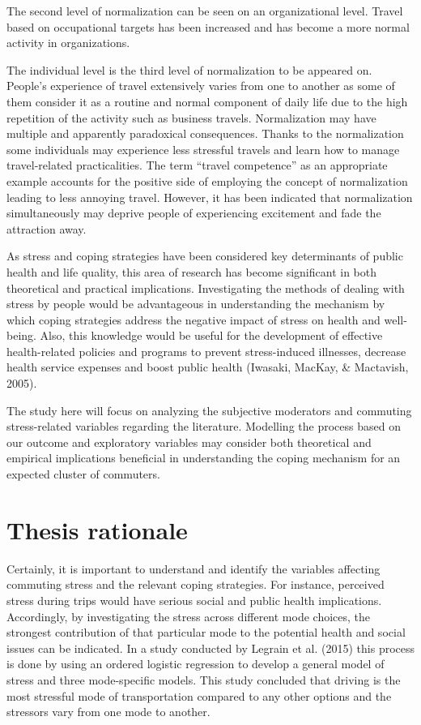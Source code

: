 \documentclass[
11pt, %
oneside, %
english, %
singlespacing, %
]{macthesis} %
\begin{document}
The second level of normalization can be seen on an organizational level. Travel based on occupational targets has been increased and has become a more normal activity in organizations.

The individual level is the third level of normalization to be appeared on. People's experience of travel extensively varies from one to another as some of them consider it as a routine and normal component of daily life due to the high repetition of the activity such as business travels. Normalization may have multiple and apparently paradoxical consequences. Thanks to the normalization some individuals may experience less stressful travels and learn how to manage travel-related practicalities. The term ``travel competence'' as an appropriate example accounts for the positive side of employing the concept of normalization leading to less annoying travel. However, it has been indicated that normalization simultaneously may deprive people of experiencing excitement and fade the attraction away.

As stress and coping strategies have been considered key determinants of public health and life quality, this area of research has become significant in both theoretical and practical implications. Investigating the methods of dealing with stress by people would be advantageous in understanding the mechanism by which coping strategies address the negative impact of stress on health and well-being. Also, this knowledge would be useful for the development of effective health-related policies and programs to prevent stress-induced illnesses, decrease health service expenses and boost public health (Iwasaki, MacKay, \& Mactavish, 2005).

The study here will focus on analyzing the subjective moderators and commuting stress-related variables regarding the literature. Modelling the process based on our outcome and exploratory variables may consider both theoretical and empirical implications beneficial in understanding the coping mechanism for an expected cluster of commuters.

\hypertarget{thesis-rationale}{%
\section{Thesis rationale}\label{thesis-rationale}}

Certainly, it is important to understand and identify the variables affecting commuting stress and the relevant coping strategies. For instance, perceived stress during trips would have serious social and public health implications. Accordingly, by investigating the stress across different mode choices, the strongest contribution of that particular mode to the potential health and social issues can be indicated. In a study conducted by Legrain et al. (2015) this process is done by using an ordered logistic regression to develop a general model of stress and three mode-specific models. This study concluded that driving is the most stressful mode of transportation compared to any other options and the stressors vary from one mode to another.
\end{document}
